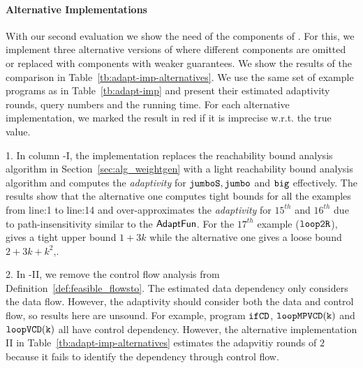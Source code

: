 


\paragraph{Alternative Implementations}

With our second evaluation we show the need of the 
components of {\THESYSTEM}. For this, we implement three alternative
versions of {\THESYSTEM} where different components are omitted or
replaced with components with weaker guarantees. We show the
results  of the comparison in
Table~\ref{tb:adapt-imp-alternatives}. We use the same set of example programs as in
Table~\ref{tb:adapt-imp} and present their estimated adaptivity
rounds, query numbers and the running time.  For each alternative
implementation, we marked the result in red if it is imprecise
w.r.t. the true value.

1. In column {\THESYSTEM}-I, the implementation replaces the reachability bound analysis algorithm in Section~\ref{sec:alg_weightgen} with a light reachability bound analysis algorithm and computes the \emph{adaptivity} for
$\mathtt{jumboS}, \mathtt{jumbo}$ and $\mathtt{big}$ effectively.
The results show that the alternative one computes tight bounds for all the examples from line:1 to line:14
and over-approximates the \emph{adaptivity} for $15^{th}$ and $16^{th}$ due to path-insensitivity similar to the
$\textsf{AdaptFun}$.
For the $17^{th}$ example ($\mathtt{loop2R}$), {\THESYSTEM} gives a tight upper bound $1+3k$ while the alternative one gives a loose bound$2+3k+k^2$,.

2. In {\THESYSTEM}-II, we remove the control flow analysis from Definition~\ref{def:feasible_flowsto}.
The estimated data dependency only considers the data flow.
However, the adaptivity should consider both the data and control flow, so results here are unsound.
For example, program $\mathtt{ifCD}$, $ \mathtt{loopMPVCD(k)} $ and $\mathtt{loopVCD(k)} $ all have control dependency.
However, the alternative implementation II in Table~\ref{tb:adapt-imp-alternatives} estimates the adapvitiy rounds of $2$ because it fails to identify the dependency through control flow.

